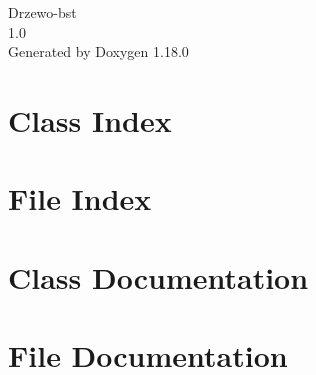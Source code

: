 \documentclass[twoside]{book}
\newcommand{\+}{\discretionary{\mbox{\scriptsize$\hookleftarrow$}}{}{}}
\newcommand{\clearemptydoublepage}{%
    \newpage{\pagestyle{empty}\cleardoublepage}%
  }
\begin{document}
  \raggedbottom
    \hypersetup{pageanchor=false,
                bookmarksnumbered=true,
                pdfencoding=unicode
               }
  \begin{titlepage}
  \vspace*{7cm}
  \begin{center}%
  {\Large Drzewo-\/bst}\\
  [1ex]\large 1.\+0 \\
  \vspace*{1cm}
  {\large Generated by Doxygen 1.18.0}\\
  \end{center}
  \end{titlepage}
  \clearemptydoublepage
  \tableofcontents
  \clearemptydoublepage
  \hypersetup{pageanchor=true}
\chapter{Class Index}

\chapter{File Index}

\chapter{Class Documentation}



\chapter{File Documentation}









  \backmatter
  \newpage
  \clearemptydoublepage
  \printindex
\end{document}

